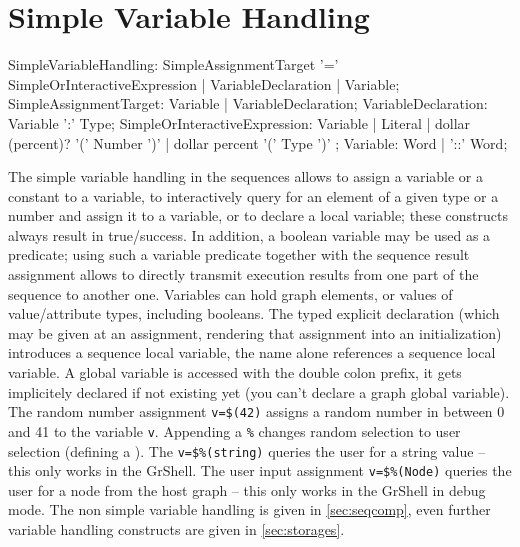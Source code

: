 \section{Simple Variable Handling}\label{sec:simplevarhandling}

\begin{rail}
  SimpleVariableHandling: SimpleAssignmentTarget '=' SimpleOrInteractiveExpression | VariableDeclaration | Variable;
  SimpleAssignmentTarget: Variable | VariableDeclaration; 
	VariableDeclaration: Variable ':' Type;
	SimpleOrInteractiveExpression:
		Variable |  
		Literal | 
		dollar (percent)? '(' Number ')' |
		dollar percent '(' Type ')'
  ;
  Variable: Word | '::' Word;
\end{rail}\makeatother

The simple variable handling in the sequences allows to assign a variable or a constant to a variable, to interactively query for an element of a given type or a number and assign it to a variable, or to declare a local variable; these constructs always result in true/success.
In addition, a boolean variable may be used as a predicate; using such a variable predicate together with the sequence result assignment allows to directly transmit execution results from one part of the sequence to another one.
Variables can hold graph elements, or values of value/attribute types, including booleans.
The typed explicit declaration (which may be given at an assignment, rendering that assignment into an initialization) introduces a sequence local variable, the name alone references a sequence local variable.
A global variable is accessed with the double colon prefix, it gets implicitely declared if not existing yet (you can't declare a graph global variable).
The random number assignment \texttt{v=\$(42)} assigns a random number in between 0 and 41 to the variable \texttt{v}. 
Appending a \texttt{\%} changes random selection to user selection (defining a ).
The  \texttt{v=\$\%(string)} queries the user for a string value -- this only works in the GrShell.
The user input assignment \texttt{v=\$\%(Node)} queries the user for a node from the host graph -- this only works in the GrShell in debug mode.
The non simple variable handling is given in \ref{sec:seqcomp}, even further variable handling constructs are given in \ref{sec:storages}.


